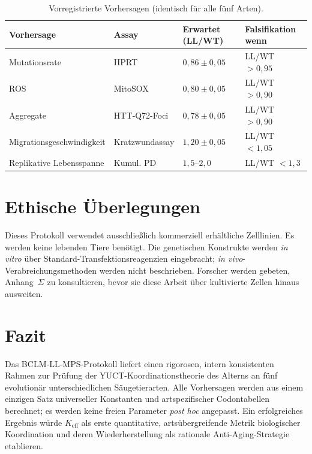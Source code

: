 \documentclass[12pt,a4paper]{article}
\begin{document}
	\begin{table}[H]
		\centering
		\caption{Vorregistrierte Vorhersagen (identisch für alle fünf Arten).}
		\label{tab:predictions}
		\begin{tabular}{@{}llll@{}}
			\toprule
			\textbf{Vorhersage} & \textbf{Assay} & \textbf{Erwartet (LL/WT)} & \textbf{Falsifikation wenn} \\
			\midrule
			Mutationsrate       & HPRT           & \(0,86 \pm 0,05\) & LL/WT \(> 0,95\) \\
			ROS                 & MitoSOX        & \(0,80 \pm 0,05\) & LL/WT \(> 0,90\) \\
			Aggregate           & HTT‑Q72-Foci   & \(0,78 \pm 0,05\) & LL/WT \(> 0,90\) \\
			Migrationsgeschwindigkeit & Kratzwundassay & \(1,20 \pm 0,05\) & LL/WT \(< 1,05\) \\
			Replikative Lebensspanne & Kumul. PD     & \(1,5\)–\(2,0\)   & LL/WT \(< 1,3\) \\
			\bottomrule
		\end{tabular}
	\end{table}
	
	\section{Ethische Überlegungen}
	\label{sec:ethics}
	Dieses Protokoll verwendet ausschließlich kommerziell erhältliche Zelllinien. Es werden keine lebenden Tiere benötigt. Die genetischen Konstrukte werden \textit{in vitro} über Standard-Transfektionsreagenzien eingebracht; \textit{in vivo}-Verabreichungsmethoden werden nicht beschrieben. Forscher werden gebeten, Anhang~\(\Sigma\) zu konsultieren, bevor sie diese Arbeit über kultivierte Zellen hinaus ausweiten.
	
	\section{Fazit}
	\label{sec:conclusion}
	Das BCLM‑LL‑MPS-Protokoll liefert einen rigorosen, intern konsistenten Rahmen zur Prüfung der YUCT-Koordinationstheorie des Alterns an fünf evolutionär unterschiedlichen Säugetierarten. Alle Vorhersagen werden aus einem einzigen Satz universeller Konstanten und artspezifischer Codontabellen berechnet; es werden keine freien Parameter \textit{post hoc} angepasst. Ein erfolgreiches Ergebnis würde \(K_{\mathrm{eff}}\) als erste quantitative, artsübergreifende Metrik biologischer Koordination und deren Wiederherstellung als rationale Anti-Aging-Strategie etablieren.
	
\end{document}

